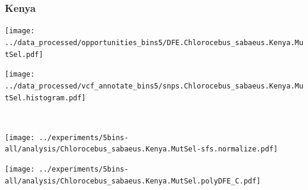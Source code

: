 \subsubsection{Kenya}

\begin{minipage}{0.49\linewidth}
    \texttt{[image: ../data\_processed/opportunities\_bins5/DFE.Chlorocebus\_sabaeus.Kenya.MutSel.pdf]}
\end{minipage}
\begin{minipage}{0.49\linewidth}
    \texttt{[image: ../data\_processed/vcf\_annotate\_bins5/snps.Chlorocebus\_sabaeus.Kenya.MutSel.histogram.pdf]}
\end{minipage}
\\
\begin{minipage}{0.49\linewidth}
    \texttt{[image: ../experiments/5bins-all/analysis/Chlorocebus\_sabaeus.Kenya.MutSel-sfs.normalize.pdf]}
\end{minipage}
\begin{minipage}{0.4\linewidth}
    \texttt{[image: ../experiments/5bins-all/analysis/Chlorocebus\_sabaeus.Kenya.MutSel.polyDFE\_C.pdf]}
\end{minipage}
